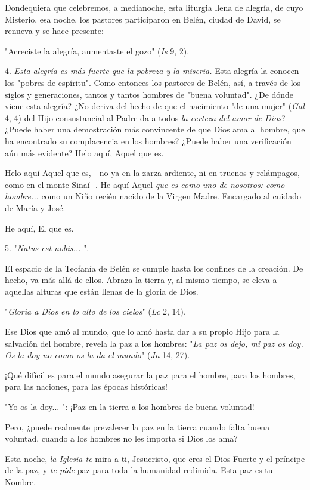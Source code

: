 Dondequiera que celebremos, a medianoche, esta liturgia llena de
alegría, de cuyo Misterio, esa noche, los pastores participaron en
Belén, ciudad de David, se renueva y se hace presente:

"Acreciste la alegría, aumentaste el gozo" (\emph{Is} 9, 2).

4. \emph{Esta alegría es más fuerte que la pobreza y la miseria.} Esta
alegría la conocen los "pobres de espíritu". Como entonces los pastores
de Belén, así, a través de los siglos y generaciones, tantos y tantos
hombres de "buena voluntad". ¿De dónde viene esta alegría? ¿No deriva
del hecho de que el nacimiento "de una mujer" (\emph{Gal} 4, 4) del Hijo
consustancial al Padre da a todos \emph{la certeza del amor de Dios}?
¿Puede haber una demostración más convincente de que Dios ama al hombre,
que ha encontrado su complacencia en los hombres? ¿Puede haber una
verificación aún más evidente? Helo aquí, Aquel que es.

Helo aquí Aquel que es, -\/-no ya en la zarza ardiente, ni en truenos y
relámpagos, como en el monte Sinaí-\/-. He aquí Aquel \emph{que es como
	uno de nosotros: como hombre...} como un Niño recién nacido de la Virgen
Madre. Encargado al cuidado de María y José.

He aquí, El que es.

5. "\emph{Natus est nobis...} ".

El espacio de la Teofanía de Belén se cumple hasta los confines de la
creación. De hecho, va más allá de ellos. Abraza la tierra y, al mismo
tiempo, se eleva a aquellas alturas que están llenas de la gloria de
Dios.

"\emph{Gloria a Dios en lo alto de los cielos}" (\emph{Lc} 2, 14).

Ese Dios que amó al mundo, que lo amó hasta dar a su propio Hijo para la
salvación del hombre, revela la paz a los hombres: "\emph{La paz os
	dejo, mi paz os doy. Os la doy no como os la da el mundo}" (\emph{Jn}
14, 27).

¡Qué difícil es para el mundo asegurar la paz para el hombre, para los
hombres, para las naciones, para las épocas históricas!

"Yo os la doy... ": ¡Paz en la tierra a los hombres de buena voluntad!

Pero, ¿puede realmente prevalecer la paz en la tierra cuando falta buena
voluntad, cuando a los hombres no les importa si Dios los ama?

Esta noche, \emph{la Iglesia te} mira a ti, Jesucristo, que eres el Dios
Fuerte y el príncipe de la paz, y \emph{te pide} paz para toda la
humanidad redimida. Esta paz es tu Nombre.


